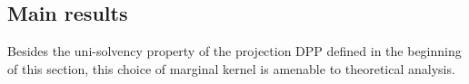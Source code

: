 \documentclass[twoside,11pt]{book}
\DeclareMathOperator{\Tran}{\intercal}
\begin{document}
\subsection{Main results}
\label{subsec:unreg_opt_problem}
Besides the uni-solvency property of the projection DPP defined in the beginning of this section, this choice of marginal kernel is amenable to theoretical analysis.




\end{document}
